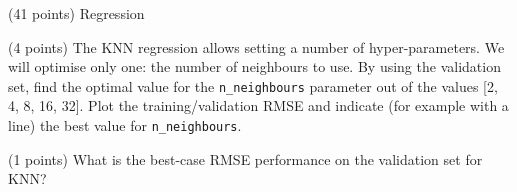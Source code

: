 \documentclass[12pt]{article}
\begin{document}
\begin{question}{\label{Q_LR_BA}(41 points) Regression}
\begin{subquestion}



\end{subquestion}

\begin{subquestion}{(4 points) The KNN regression allows setting a number of hyper-parameters. We will optimise only one: the number of neighbours to use. By using the validation set, find the optimal value for the \texttt{n\_neighbours} parameter out of the values [2, 4, 8, 16, 32]. Plot the training/validation RMSE and indicate (for example with a line) the best value for \texttt{n\_neighbours}.}






\end{subquestion}

\begin{subquestion}{(1 points) What is the best-case RMSE performance on the validation set for KNN?}




\end{subquestion}
\end{question}
\end{document}

